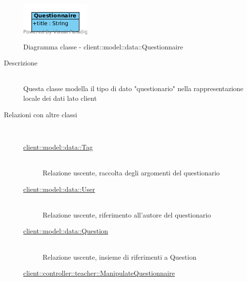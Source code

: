 \begin{center}
			\begin{figure}[H]
				\centering \includegraphics[scale=4, max width=\textwidth, max height=\myheight]{../img/diagrammiClassi/client/model/data/Questionnaire.png}
				\caption{Diagramma classe - client::model::data::Questionnaire}
			\end{figure}
		\end{center}\begin{description}
\item[Descrizione] \hfill \\
 Questa classe modella il tipo di dato "questionario" nella rappresentazione locale dei dati lato client
\item[Relazioni con altre classi] \hfill \\
 \vspace{-7mm}
\begin{description}
\item[\hyperlink{client::model::data::Tag}{client::model::data::Tag}] \hfill \\
 Relazione uscente, raccolta degli argomenti del questionario
\item[\hyperlink{client::model::data::User}{client::model::data::User}] \hfill \\
 Relazione uscente, riferimento all'autore del questionario
\item[\hyperlink{client::model::data::Question}{client::model::data::Question}] \hfill \\
 Relazione uscente, insieme di riferimenti a Question
\item[\hyperlink{client::controller::teacher::ManipulateQuestionnaire}{client::controller::teacher::ManipulateQuestionnaire}] \hfill \\

\end{description}
\end{description}
